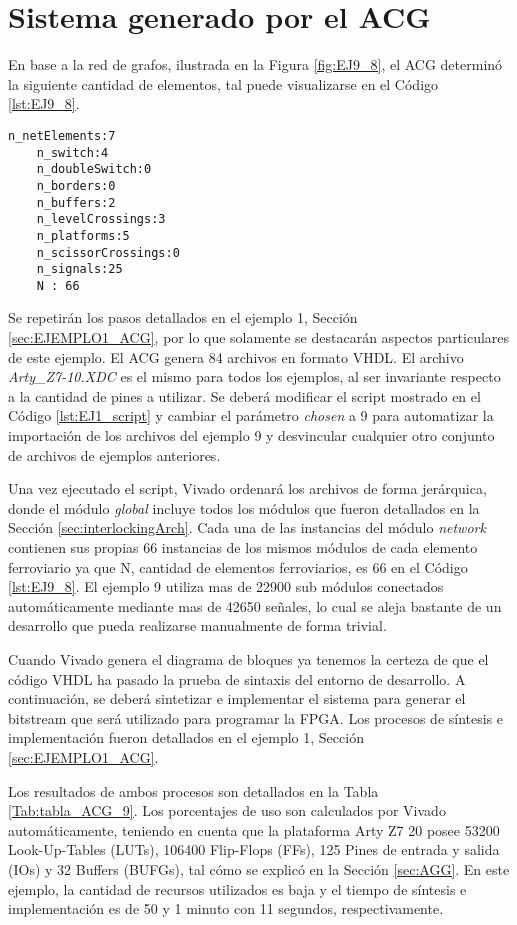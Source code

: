 \section{Sistema generado por el ACG}

	En base a la red de grafos, ilustrada en la Figura \ref{fig:EJ9_8}, el ACG determinó la siguiente cantidad de elementos, tal puede visualizarse en el Código \ref{lst:EJ9_8}.
	
	\begin{lstlisting}[language = {}, caption = Cantidad de elementos a implementar por el ACG, label = {lst:EJ9_8}]
	n_netElements:7
	n_switch:4
	n_doubleSwitch:0
	n_borders:0
	n_buffers:2
	n_levelCrossings:3
	n_platforms:5
	n_scissorCrossings:0
	n_signals:25
	N : 66
	\end{lstlisting}
	
	Se repetirán los pasos detallados en el ejemplo 1, Sección \ref{sec:EJEMPLO1_ACG}, por lo que solamente se destacarán aspectos particulares de este ejemplo. El ACG genera 84 archivos en formato VHDL. El archivo \textit{Arty\_Z7-10.XDC} es el mismo para todos los ejemplos, al ser invariante respecto a la cantidad de pines a utilizar. Se deberá modificar el script mostrado en el Código \ref{lst:EJ1_script} y cambiar el parámetro \textit{chosen} a 9 para automatizar la importación de los archivos del ejemplo 9 y desvincular cualquier otro conjunto de archivos de ejemplos anteriores.
	
	Una vez ejecutado el script, Vivado ordenará los archivos de forma jerárquica, donde el módulo \textit{global} incluye todos los módulos que fueron detallados en la Sección \ref{sec:interlockingArch}. Cada una de las instancias del módulo \textit{network} contienen sus propias 66 instancias de los mismos módulos de cada elemento ferroviario ya que N, cantidad de elementos ferroviarios, es 66 en el Código \ref{lst:EJ9_8}. El ejemplo 9 utiliza mas de 22900 sub módulos conectados automáticamente mediante mas de 42650 señales, lo cual se aleja bastante de un desarrollo que pueda realizarse manualmente de forma trivial.
	
	Cuando Vivado genera el diagrama de bloques ya tenemos la certeza de que el código VHDL ha pasado la prueba de sintaxis del entorno de desarrollo. A continuación, se deberá sintetizar e implementar el sistema para generar el bitstream que será utilizado para programar la FPGA. Los procesos de síntesis e implementación fueron detallados en el ejemplo 1, Sección \ref{sec:EJEMPLO1_ACG}.
	
	Los resultados de ambos procesos son detallados en la Tabla \ref{Tab:tabla_ACG_9}. Los porcentajes de uso son calculados por Vivado automáticamente, teniendo en cuenta que la plataforma Arty Z7 20 posee 53200 Look-Up-Tables (LUTs), 106400 Flip-Flops (FFs), 125 Pines de entrada y salida (IOs) y 32 Buffers (BUFGs), tal cómo se explicó en la Sección \ref{sec:AGG}. En este ejemplo, la cantidad de recursos utilizados es baja y el tiempo de síntesis e implementación es de 50 y 1 minuto con 11 segundos, respectivamente.
	
